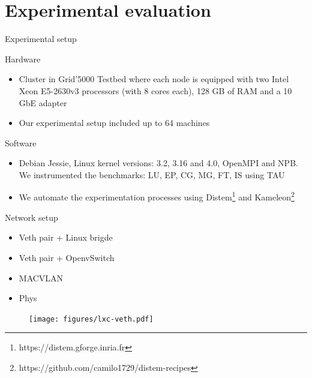 \documentclass[presentation]{beamer}
\begin{document}
\section{Experimental evaluation}
\label{sec-3}

\begin{frame}[label=sec-3-1]{Experimental setup}
\begin{block}{Hardware}
\begin{itemize}
\item Cluster in Grid'5000 Testbed\cite{grid5000} where each node is equipped
with two Intel Xeon E5-2630v3 processors (with 8 cores each), 128 GB of RAM and a 10 GbE adapter
\item Our experimental setup included up to 64 machines
\end{itemize}
\end{block}

\begin{block}{Software}
\begin{itemize}
\item Debian Jessie, Linux kernel versions: 3.2, 3.16 and 4.0, OpenMPI and NPB.
We instrumented the benchmarks: LU, EP, CG, MG, FT, IS using TAU
\end{itemize}
\begin{itemize}
\item We automate the experimentation processes using Distem\footnote{https://distem.gforge.inria.fr}
  and Kameleon\footnote{https://github.com/camilo1729/distem-recipes}
\end{itemize}
\end{block}
\end{frame}

\begin{frame}[label=sec-3-2]{Network setup}
\begin{itemize}
\item \alert{Veth pair + Linux brigde}
\item Veth pair + OpenvSwitch
\item MACVLAN
\item Phys
\end{itemize}

\begin{figure}[!h]
  \center
  \texttt{[image: figures/lxc-veth.pdf]}
  \label{fig:hpc}
\end{figure}
\end{frame}
\end{document}

